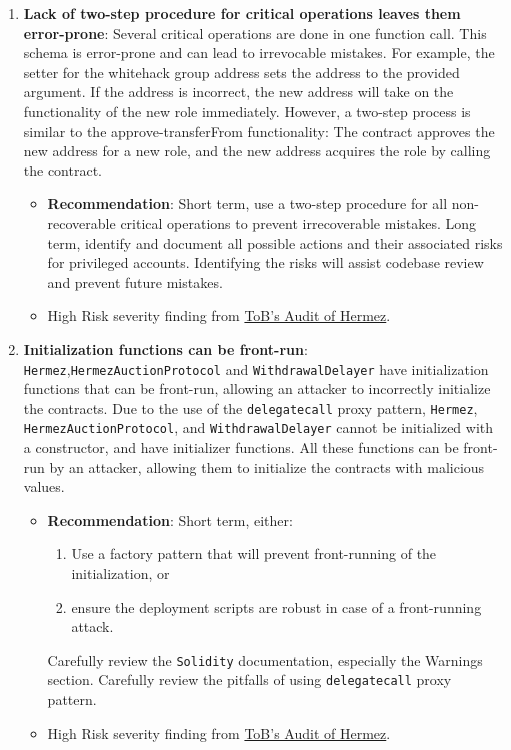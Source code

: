\begin{enumerate}
\item\textbf{Lack of two-step procedure for critical operations leaves them error-prone}: Several critical operations are done in one function call. This schema is error-prone and can lead to irrevocable mistakes. For example, the setter for the whitehack group address sets the address to the provided argument. If the address is incorrect, the new address will take on the functionality of the new role immediately. However, a two-step process is similar to the approve-transferFrom functionality: The contract approves the new address for a new role, and the new address acquires the role by calling the contract.
	\begin{itemize}
	\item\textbf{Recommendation}: Short term, use a two-step procedure for all non-recoverable critical operations to prevent irrecoverable mistakes. Long term, identify and document all possible actions and their associated risks for privileged accounts. Identifying the risks will assist codebase review and prevent future mistakes.
	\item High Risk severity finding from \href{https://github.com/trailofbits/publications/blob/master/reviews/hermez.pdf}{ToB’s Audit of Hermez}.
	\end{itemize}

\item\textbf{Initialization functions can be front-run}: \verb|Hermez|,\linebreak\verb|HermezAuctionProtocol| and \verb|WithdrawalDelayer| have initialization functions that can be front-run, allowing an attacker to incorrectly initialize the contracts. Due to the use of the \verb|delegatecall| proxy pattern, \verb|Hermez|, \verb|HermezAuctionProtocol|, and \verb|WithdrawalDelayer| cannot be initialized with a constructor, and have initializer functions. All these functions can be front-run by an attacker, allowing them to initialize the contracts with malicious values.
	\begin{itemize}
	\item\textbf{Recommendation}: Short term, either:
	    \begin{enumerate}
	    \item Use a factory pattern that will prevent front-running of the initialization, or
	    \item ensure the deployment scripts are robust in case of a front-running attack.
	    \end{enumerate}
	    Carefully review the \verb|Solidity| documentation, especially the Warnings section. Carefully review the pitfalls of using \verb|delegatecall| proxy pattern.
	\item High Risk severity finding from \href{https://github.com/trailofbits/publications/blob/master/reviews/hermez.pdf}{ToB’s Audit of Hermez}.
	\end{itemize}


\end{enumerate}
